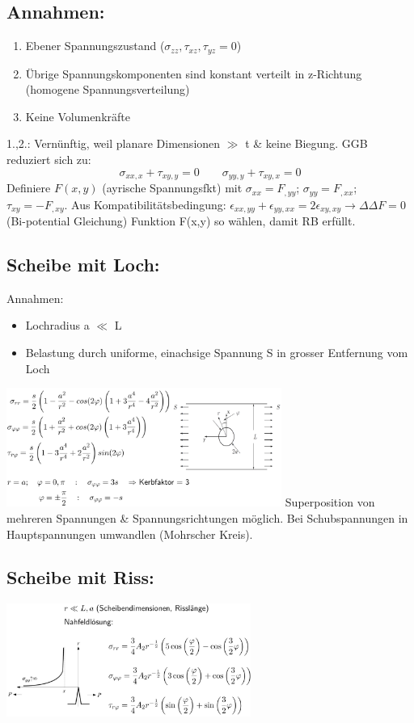 \documentclass[a4paper,10pt]{article}
\begin{document}
\begin{multicols}{3}
    \subsection{Annahmen:}
        \begin{enumerate}[noitemsep]
            \item Ebener Spannungszustand ($\sigma_{zz},\tau_{xz},\tau_{yz}=0$)
            \item Übrige Spannungskomponenten sind konstant verteilt in z-Richtung (homogene Spannungsverteilung)
            \item Keine Volumenkräfte
        \end{enumerate}
        1.,2.: Vernünftig, weil planare Dimensionen $\gg$ t \& keine Biegung. GGB reduziert sich zu:
        \[\sigma_{xx,x} + \tau_{xy,y}=0\quad\quad\sigma_{yy,y} + \tau_{xy,x}=0\]
        Definiere $F(x,y)$ (ayrische Spannungsfkt) mit $\sigma_{xx}=F_{,yy}$; $\sigma_{yy}=F_{,xx}$; $\tau_{xy}=-F_{,xy}$. Aus Kompatibilitätsbedingung: $\epsilon_{xx,yy}+\epsilon_{yy,xx}=2\epsilon_{xy,xy} \rightarrow \Delta\Delta F=0$ (Bi-potential Gleichung) Funktion F(x,y) so wählen, damit RB erfüllt.
    \subsection{Scheibe mit Loch:}
        Annahmen:
        \begin{itemize}
            \item Lochradius a $\ll$ L
            \item Belastung durch uniforme, einachsige Spannung S in grosser Entfernung vom Loch
        \end{itemize}
        \includegraphics[width=90mm]{Scheibeloch}
        Superposition von mehreren Spannungen \& Spannungsrichtungen möglich. Bei Schubspannungen in Hauptspannungen umwandlen (Mohrscher Kreis).
    \subsection{Scheibe mit Riss:}
        \includegraphics[width=80mm]{Scheiberiss}
        

\end{multicols}
\end{document}
